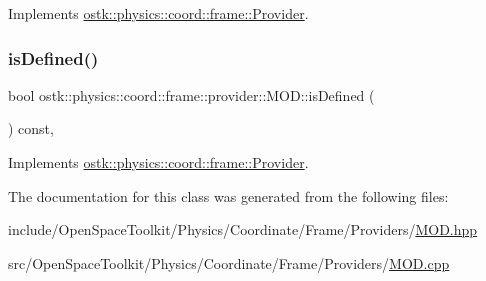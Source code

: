 Implements \hyperlink{classostk_1_1physics_1_1coord_1_1frame_1_1_provider_a38b86a589f46f8b8a9c97ab2776f37d1}{ostk\+::physics\+::coord\+::frame\+::\+Provider}.

\mbox{\label{classostk_1_1physics_1_1coord_1_1frame_1_1provider_1_1_m_o_d_a0b6a40a222857ad032f5d5a8d228ab16}} 
\subsubsection{\texorpdfstring{is\+Defined()}{isDefined()}}
{\footnotesize\ttfamily bool ostk\+::physics\+::coord\+::frame\+::provider\+::\+M\+O\+D\+::is\+Defined (\begin{DoxyParamCaption}{ }\end{DoxyParamCaption}) const\hspace{0.3cm}{\ttfamily [override]}, {\ttfamily [virtual]}}



Implements \hyperlink{classostk_1_1physics_1_1coord_1_1frame_1_1_provider_a27acab0012649796b97956fed1a91493}{ostk\+::physics\+::coord\+::frame\+::\+Provider}.



The documentation for this class was generated from the following files\+:\begin{DoxyCompactItemize}
\item 
include/\+Open\+Space\+Toolkit/\+Physics/\+Coordinate/\+Frame/\+Providers/\hyperlink{_m_o_d_8hpp}{M\+O\+D.\+hpp}\item 
src/\+Open\+Space\+Toolkit/\+Physics/\+Coordinate/\+Frame/\+Providers/\hyperlink{_m_o_d_8cpp}{M\+O\+D.\+cpp}\end{DoxyCompactItemize}
